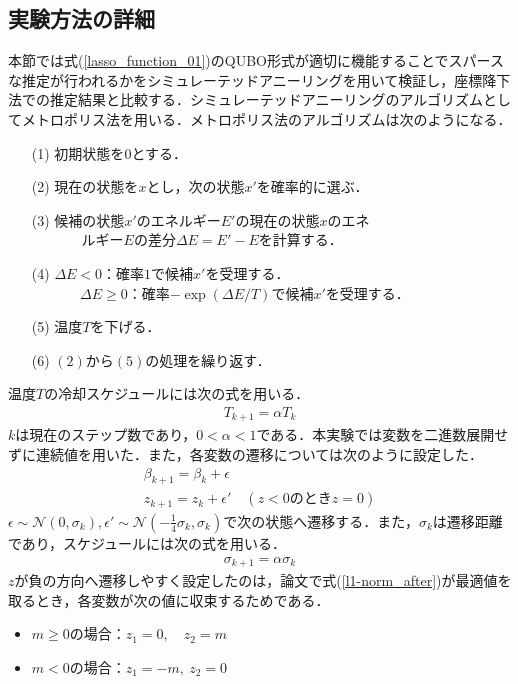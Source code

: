 \documentclass[technicalreport]{ieicej}
\begin{document}
\subsection{実験方法の詳細}
本節では式(\ref{lasso_function_01})のQUBO形式が適切に機能することでスパースな推定が行われるかをシミュレーテッドアニーリングを用いて検証し，座標降下法での推定結果と比較する．シミュレーテッドアニーリングのアルゴリズムとしてメトロポリス法を用いる．メトロポリス法のアルゴリズムは次のようになる．
\begin{enumerate}
\item[(1)] 初期状態を$0$とする．
\item[(2)] 現在の状態を$x$とし，次の状態$x'$を確率的に選ぶ．
\item[(3)] 候補の状態$x'$のエネルギー$E'$の現在の状態$x$のエネ\\
  $\qquad \quad \ $ ルギー$E$の差分$\Delta E=E'-E$を計算する．
\item[(4)] $\Delta E<0$：確率$1$で候補$x'$を受理する．\\
  $\qquad \quad \ \ \Delta E\geq 0$：確率$-\exp (\Delta E/T)$で候補$x'$を受理する．
\item[(5)] 温度$T$を下げる．
\item[(6)] $(2)$から$(5)$の処理を繰り返す．
\end{enumerate}
温度$T$の冷却スケジュールには次の式を用いる．
\begin{eqnarray}
  T_{k+1} = \alpha T_{k}
\end{eqnarray}
$k$は現在のステップ数であり，$0<\alpha <1$である．本実験では変数を二進数展開せずに連続値を用いた．また，各変数の遷移については次のように設定した．
\begin{eqnarray}
  \beta_{k+1} = \beta_{k} + \epsilon　\\
  z_{k+1} = z_{k} + \epsilon ' \quad (z<0のときz=0)
\end{eqnarray}
$\epsilon\sim\mathcal{N}(0,\sigma_{k}),\epsilon '\sim\mathcal{N}(-\frac{1}{4}\sigma_{k},\sigma_{k})$で次の状態へ遷移する．また，$\sigma_{k}$は遷移距離であり，スケジュールには次の式を用いる．
\begin{eqnarray}
  \sigma_{k+1} = \alpha \sigma_{k}
\end{eqnarray}
$z$が負の方向へ遷移しやすく設定したのは，論文\cite{l1-norm}で式(\ref{l1-norm_after})が最適値を取るとき，各変数が次の値に収束するためである．
\begin{itemize}
\item $m\geq 0$の場合：$z_{1}=0,\quad z_{2}=m$
\item $m<0$の場合：$z_{1}=-m,\ z_{2}=0$
\end{itemize}
\end{document}
